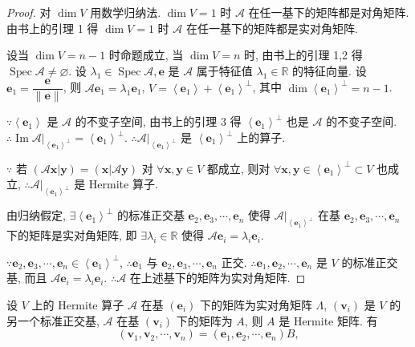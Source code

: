 \documentclass{ctexart}
\begin{document}
\begin{proof}
    对 $\dim V$ 用数学归纳法. $\dim V=1$ 时 $\mathcal{A}$ 在任一基下的矩阵都是对角矩阵. 由书上的引理 1 得 $\dim V=1$ 时 $\mathcal{A}$ 在任一基下的矩阵都是实对角矩阵.

    设当 $\dim V=n-1$ 时命题成立, 当 $\dim V=n$ 时, 由书上的引理 1,2 得 $\operatorname{Spec}\mathcal{A}\neq\varnothing$. 设 $\lambda_1\in\operatorname{Spec}\mathcal{A},\boldsymbol{e}$ 是 $\mathcal{A}$ 属于特征值 $\lambda_1\in\mathbb{R}$ 的特征向量. 设 $\boldsymbol{e}_1=\dfrac{\boldsymbol{e}}{\|\boldsymbol{e}\|}$, 则 $\mathcal{A}\boldsymbol{e}_1=\lambda_1\boldsymbol{e}_1$, $V=\left<\boldsymbol{e}_1\right>+\left<\boldsymbol{e}_1\right>^\perp$, 其中 $\dim\left<\boldsymbol{e}_1\right>^\perp=n-1$.

    $\because\left<\boldsymbol{e}_1\right>$ 是 $\mathcal{A}$ 的不变子空间, 由书上的引理 3 得 $\left<\boldsymbol{e}_1\right>^\perp$ 也是 $\mathcal{A}$ 的不变子空间. $\therefore\operatorname{Im}\mathcal{A}|_{\left<\boldsymbol{e}_1\right>^\perp}=\left<\boldsymbol{e}_1\right>^\perp$. $\therefore\mathcal{A}|_{\left<\boldsymbol{e}_1\right>^\perp}$ 是 $\left<\boldsymbol{e}_1\right>^\perp$ 上的算子.

    $\because$ 若 $(\mathcal{A}\boldsymbol{x}|\boldsymbol{y})=(\boldsymbol{x}|\mathcal{A}\boldsymbol{y})$ 对 $\forall\boldsymbol{x},\boldsymbol{y}\in V$ 都成立, 则对 $\forall\boldsymbol{x},\boldsymbol{y}\in\left<\boldsymbol{e}_1\right>^\perp\subset V$ 也成立, $\therefore\mathcal{A}|_{\left<\boldsymbol{e}_1\right>^\perp}$ 是 Hermite 算子.

    由归纳假定, $\exists\left<\boldsymbol{e}_1\right>^\perp$ 的标准正交基 $\boldsymbol{e}_2,\boldsymbol{e}_3,\cdots,\boldsymbol{e}_n$ 使得 $\mathcal{A}|_{\left<\boldsymbol{e}_1\right>^\perp}$ 在基 $\boldsymbol{e}_2,\boldsymbol{e}_3,\cdots,\boldsymbol{e}_n$ 下的矩阵是实对角矩阵, 即 $\exists\lambda_i\in\mathbb{R}$ 使得 $\mathcal{A}\boldsymbol{e}_i=\lambda_i\boldsymbol{e}_i$.

    $\because\boldsymbol{e}_2,\boldsymbol{e}_3,\cdots,\boldsymbol{e}_n\in\left<\boldsymbol{e}_1\right>^\perp$, $\therefore\boldsymbol{e}_1$ 与 $\boldsymbol{e}_2,\boldsymbol{e}_3,\cdots,\boldsymbol{e}_n$ 正交. $\therefore\boldsymbol{e}_1,\boldsymbol{e}_2,\cdots,\boldsymbol{e}_n$ 是 $V$ 的标准正交基, 而且 $\mathcal{A}\boldsymbol{e}_i=\lambda_i\boldsymbol{e}_i$. $\therefore\mathcal{A}$ 在上述基下的矩阵为实对角矩阵.
\end{proof}
设 $V$ 上的 Hermite 算子 $\mathcal{A}$ 在基 $(\boldsymbol{e}_i)$ 下的矩阵为实对角矩阵 $\Lambda$, $(\boldsymbol{v}_i)$ 是 $V$ 的另一个标准正交基, $\mathcal{A}$ 在基 $(\boldsymbol{v}_i)$ 下的矩阵为 $A$, 则 $A$ 是 Hermite 矩阵. 有
\[(\boldsymbol{v}_1,\boldsymbol{v}_2,\cdots,\boldsymbol{v}_n)=(\boldsymbol{e}_1,\boldsymbol{e}_2,\cdots,\boldsymbol{e}_n)B,\]
\end{document}
